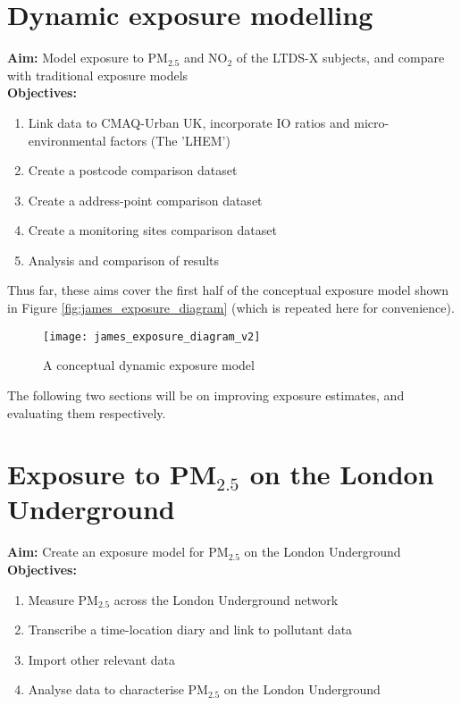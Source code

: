 \section{Dynamic exposure modelling}

\textbf{Aim:} Model exposure to PM$_{2.5}$ and NO$_{2}$ of the LTDS-X subjects, and compare  with traditional exposure models \\
\textbf{Objectives:}

\begin{enumerate}
\item Link data to CMAQ-Urban UK, incorporate IO ratios and micro-environmental factors (The 'LHEM')
\item Create a postcode comparison dataset
\item Create a address-point comparison dataset
\item Create a monitoring sites comparison dataset
\item Analysis and comparison of results
\end{enumerate}

Thus far, these aims cover the first half of the conceptual exposure model shown in Figure \ref{fig:james_exposure_diagram} (which is repeated here for convenience). 

\begin{figure}[H]
\centering
\texttt{[image: james\_exposure\_diagram\_v2]}
\caption{A conceptual dynamic exposure model}
\label{fig:james_exposure_diagram_v2}
\end{figure}

The following two sections will be on improving exposure estimates, and evaluating them respectively.

\section{Exposure to \texorpdfstring{PM$_{2.5}$}{} on the London Underground}

\textbf{Aim:} Create an exposure model for PM$_{2.5}$ on the London Underground \\
\textbf{Objectives:}

\begin{enumerate}
\item Measure PM$_{2.5}$ across the London Underground network
\item Transcribe a time-location diary and link to pollutant data
\item Import other relevant data
\item Analyse data to characterise PM$_{2.5}$ on the London Underground
\end{enumerate}

